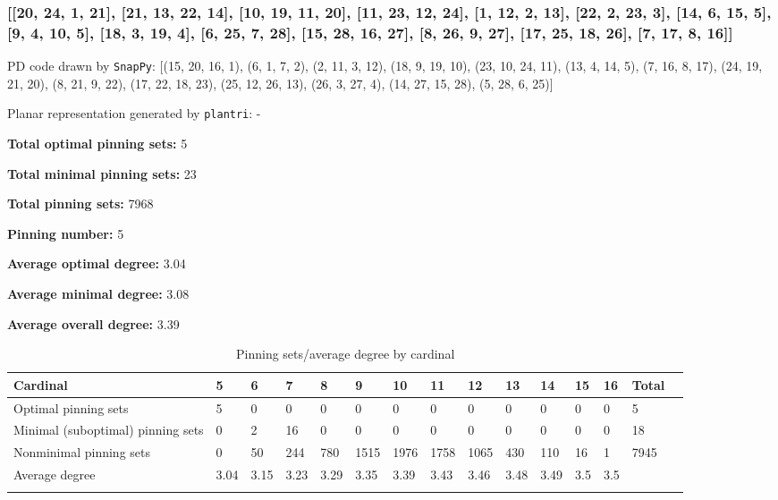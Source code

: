 \documentclass{article}%
\begin{document}
\newpage

\subsubsection{[[20, 24, 1, 21], [21, 13, 22, 14], [10, 19, 11, 20], [11, 23, 12, 24], [1, 12, 2, 13], [22, 2, 23, 3], [14, 6, 15, 5], [9, 4, 10, 5], [18, 3, 19, 4], [6, 25, 7, 28], [15, 28, 16, 27], [8, 26, 9, 27], [17, 25, 18, 26], [7, 17, 8, 16]]}

{\small\noindent PD code drawn by \texttt{SnapPy}: [(15, 20, 16, 1), (6, 1, 7, 2), (2, 11, 3, 12), (18, 9, 19, 10), (23, 10, 24, 11), (13, 4, 14, 5), (7, 16, 8, 17), (24, 19, 21, 20), (8, 21, 9, 22), (17, 22, 18, 23), (25, 12, 26, 13), (26, 3, 27, 4), (14, 27, 15, 28), (5, 28, 6, 25)]}

{\small\noindent Planar representation generated by \texttt{plantri}: -}

\begin{multicols}{2}
{\normalsize \noindent\textbf{Total optimal pinning sets:} 5

\noindent\textbf{Total minimal pinning sets:} 23

\noindent\textbf{Total pinning sets:} 7968

\noindent\textbf{Pinning number:} 5

}
\columnbreak

{\normalsize \noindent\textbf{Average optimal degree:} 3.04

\noindent\textbf{Average minimal degree:} 3.08

\noindent\textbf{Average overall degree:} 3.39

}
\end{multicols}

\begin{table}[ht]
	\caption{Pinning sets/average degree by cardinal}
	\centering
	\renewcommand{\arraystretch}{1.5}
	\begin{tabularx}{\textwidth}{lXXXXXXXXXXXXXX}
		\toprule
			Cardinal & 5 & 6 & 7 & 8 & 9 & 10 & 11 & 12 & 13 & 14 & 15 & 16 & Total\\
			\hline
			Optimal pinning sets & 5 & 0 & 0 & 0 & 0 & 0 & 0 & 0 & 0 & 0 & 0 & 0 & 5 \\
			Minimal (suboptimal) pinning sets & 0 & 2 & 16 & 0 & 0 & 0 & 0 & 0 & 0 & 0 & 0 & 0 & 18 \\
			Nonminimal pinning sets & 0 & 50 & 244 & 780 & 1515 & 1976 & 1758 & 1065 & 430 & 110 & 16 & 1 & 7945 \\
			Average degree & 3.04 & 3.15 & 3.23 & 3.29 & 3.35 & 3.39 & 3.43 & 3.46 & 3.48 & 3.49 & 3.5 & 3.5 &  \\
		\bottomrule \\ 
	\end{tabularx}
\end{table}
\end{document}
